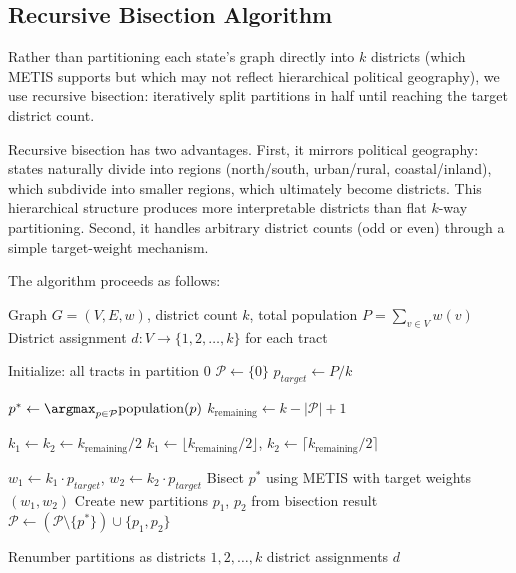 \subsection{Recursive Bisection Algorithm}

Rather than partitioning each state's graph directly into $k$ districts (which METIS supports but which may not reflect hierarchical political geography), we use recursive bisection: iteratively split partitions in half until reaching the target district count.

Recursive bisection has two advantages. First, it mirrors political geography: states naturally divide into regions (north/south, urban/rural, coastal/inland), which subdivide into smaller regions, which ultimately become districts. This hierarchical structure produces more interpretable districts than flat $k$-way partitioning. Second, it handles arbitrary district counts (odd or even) through a simple target-weight mechanism.

The algorithm proceeds as follows:

\begin{algorithm}[H]
\caption{Recursive Bisection Redistricting}
\label{alg:recursive_bisection}
\begin{algorithmic}[1]
\Require Graph $G = (V, E, w)$, district count $k$, total population $P = \sum_{v \in V} w(v)$
\Ensure District assignment $d: V \to \{1, 2, \ldots, k\}$ for each tract

\State Initialize: all tracts in partition 0
\State $\mathcal{P} \gets \{0\}$ 
\State $p_{target} \gets P / k$ 

    \State $p^* \gets \argmax_{p \in \mathcal{P}} \text{population}(p)$ 
    \State $k_{\text{remaining}} \gets k - |\mathcal{P}| + 1$ 

        \State $k_1 \gets k_2 \gets k_{\text{remaining}} / 2$ 
    \Else
        \State $k_1 \gets \lfloor k_{\text{remaining}} / 2 \rfloor$, $k_2 \gets \lceil k_{\text{remaining}} / 2 \rceil$ 
    \EndIf

    \State $w_1 \gets k_1 \cdot p_{target}$, $w_2 \gets k_2 \cdot p_{target}$ 
    \State Bisect $p^*$ using METIS with target weights $(w_1, w_2)$
    \State Create new partitions $p_1$, $p_2$ from bisection result
    \State $\mathcal{P} \gets (\mathcal{P} \setminus \{p^*\}) \cup \{p_1, p_2\}$
\EndWhile

\State Renumber partitions as districts $1, 2, \ldots, k$
\State \Return district assignments $d$
\end{algorithmic}
\end{algorithm}

